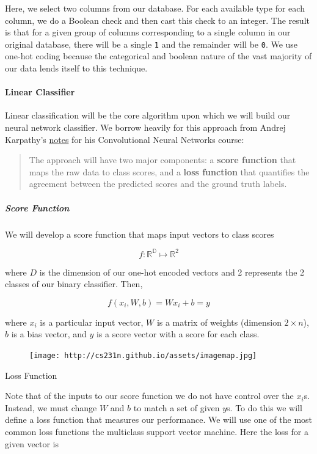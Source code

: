 \documentclass[]{report}
\begin{document}
Here, we select two columns from our database. For each available type
for each column, we do a Boolean check and then cast this check to an
integer. The result is that for a given group of columns corresponding
to a single column in our original database, there will be a single
\texttt{1} and the remainder will be \texttt{0}. We use one-hot coding
because the categorical and boolean nature of the vast majority of our
data lends itself to this technique.

\paragraph{Linear Classifier}\label{linear-classifier}

Linear classification will be the core algorithm upon which we will
build our neural network classifier. We borrow heavily for this approach
from Andrej Karpathy's
\href{http://cs231n.github.io/linear-classify/}{notes} for his
Convolutional Neural Networks course:

\begin{quote}
The approach will have two major components: a \textbf{score function}
that maps the raw data to class scores, and a \textbf{loss function}
that quantifies the agreement between the predicted scores and the
ground truth labels.
\end{quote}

\subparagraph{Score Function}\label{score-function}

We will develop a score function that maps input vectors to class scores

\[f: \mathbb{R^D} \mapsto \mathbb{R}^2\]

where $D$ is the dimension of our one-hot encoded vectors and 2
represents the 2 classes of our binary classifier. Then,

\[f(x_i, W, b)=Wx_i+b=y\]

where $x_i$ is a particular input vector, $W$ is a matrix of weights
(dimension $2 \times n$), $b$ is a bias vector, and $y$ is a score
vector with a score for each class.

\begin{figure}[htbp]
\centering
\texttt{[image: http://cs231n.github.io/assets/imagemap.jpg]}
\end{figure}

Loss Function

Note that of the inputs to our score function we do not have control
over the $x_i$s. Instead, we must change $W$ and $b$ to match a set of
given $y$s. To do this we will define a loss function that measures our
performance. We will use one of the most common loss functions the
multiclass support vector machine. Here the loss for a given vector is
\end{document}
